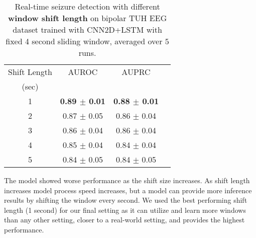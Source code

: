 \documentclass[pmlr,twocolumn,10pt]{jmlr}
\begin{document}
%
 \begin{table}[h!]
	\small
	\centering
	\caption{Real-time seizure detection with different \textbf{window shift length} on bipolar TUH EEG dataset trained with CNN2D+LSTM with fixed 4 second sliding window, averaged over $5$ runs.}
	\label{shift}
	\begin{tabular}{c|ccc}\toprule
		Shift Length & AUROC & AUPRC \\
		(sec)\\
		\midrule
		1 & \textbf{0.89 $\pm$ 0.01} & \textbf{0.88 $\pm$ 0.01}\\
		2 & 0.87 $\pm$ 0.05 & 0.86 $\pm$ 0.04\\ 
		3 & 0.86 $\pm$ 0.04 & 0.86 $\pm$ 0.04\\
		4 & 0.85 $\pm$ 0.04 & 0.84 $\pm$ 0.04\\
		5 & 0.84 $\pm$ 0.05 & 0.84 $\pm$ 0.05\\
		\bottomrule
	\end{tabular}
\end{table}
 The model showed worse performance as the shift size increases. As shift length increases model process speed increases, but a model can provide more inference results by shifting the window every second. We used the best performing shift length (1 second) for our final setting as it can utilize and learn more windows than any other setting, closer to a real-world setting, and provides the highest performance.
\end{document}
